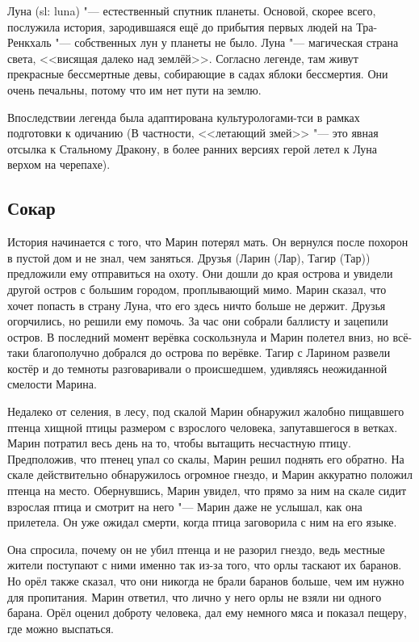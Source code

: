 Луна (sl: luna) "--- естественный спутник планеты.
Основой, скорее всего, послужила история, зародившаяся ещё до прибытия первых людей на Тра-Ренкхаль "--- собственных лун у планеты не было.
Луна "--- магическая страна света, <<висящая далеко над землёй>>.
Согласно легенде, там живут прекрасные бессмертные девы, собирающие в садах яблоки бессмертия.
Они очень печальны, потому что им нет пути на землю.

Впоследствии легенда была адаптирована культурологами-тси в рамках подготовки к одичанию (В частности, <<летающий змей>> "--- это явная отсылка к Стальному Дракону, в более ранних версиях герой летел к Луна верхом на черепахе).

\subsection{Сокар}

История начинается с того, что Марин потерял мать.
Он вернулся после похорон в пустой дом и не знал, чем заняться.
Друзья (Ларин (Лар), Тагир (Тар)) предложили ему отправиться на охоту.
Они дошли до края острова и увидели другой остров с большим городом, проплывающий мимо.
Марин сказал, что хочет попасть в страну Луна, что его здесь ничто больше не держит.
Друзья огорчились, но решили ему помочь.
За час они собрали баллисту и зацепили остров.
В последний момент верёвка соскользнула и Марин полетел вниз, но всё-таки благополучно добрался до острова по верёвке.
Тагир с Ларином развели костёр и до темноты разговаривали о происшедшем, удивляясь неожиданной смелости Марина.

Недалеко от селения, в лесу, под скалой Марин обнаружил жалобно пищавшего птенца хищной птицы размером с взрослого человека, запутавшегося в ветках.
Марин потратил весь день на то, чтобы вытащить несчастную птицу.
Предположив, что птенец упал со скалы, Марин решил поднять его обратно.
На скале действительно обнаружилось огромное гнездо, и Марин аккуратно положил птенца на место.
Обернувшись, Марин увидел, что прямо за ним на скале сидит взрослая птица и смотрит на него "--- Марин даже не услышал, как она прилетела.
Он уже ожидал смерти, когда птица заговорила с ним на его языке.

Она спросила, почему он не убил птенца и не разорил гнездо, ведь местные жители поступают с ними именно так из-за того, что орлы таскают их баранов.
Но орёл также сказал, что они никогда не брали баранов больше, чем им нужно для пропитания.
Марин ответил, что лично у него орлы не взяли ни одного барана.
Орёл оценил доброту человека, дал ему немного мяса и показал пещеру, где можно выспаться.

